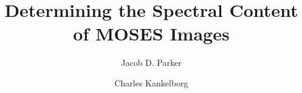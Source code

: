 %
%
%
%
%




%






\newcommand{\cck}[1]{{\color{red} CCK: #1}} %
\newcommand{\jdp}[1]{{\color{blue} JDP: #1}} %

\newcommand{\spectralline}[3]{#1\,{\textsc{#2}}\ #3\,\AA } 
\newcommand{\heii}{\spectralline{He}{ii}{303.8}}
\newcommand{\sixi}{\spectralline{Si}{xi}{303.3}}
\newcommand{\fexv}{\spectralline{Fe}{xv}{284}}
\newcommand{\fexvi}{\spectralline{Fe}{xvi}{335}}

\newcommand{\sixipix}{15.7}
\newcommand{\spectdispersvel}{$\approx30$\,km\,s$^{-1}$ per pixel}
\newcommand{\spectdisperspix}{$\approx29$\,m\AA\ per pixel}



%
%


%

\title{Determining the Spectral Content of MOSES Images}

\author[0000-0001-8732-8284]{Jacob D. Parker}
\author[0000-0002-1992-7469]{Charles Kankelborg}


